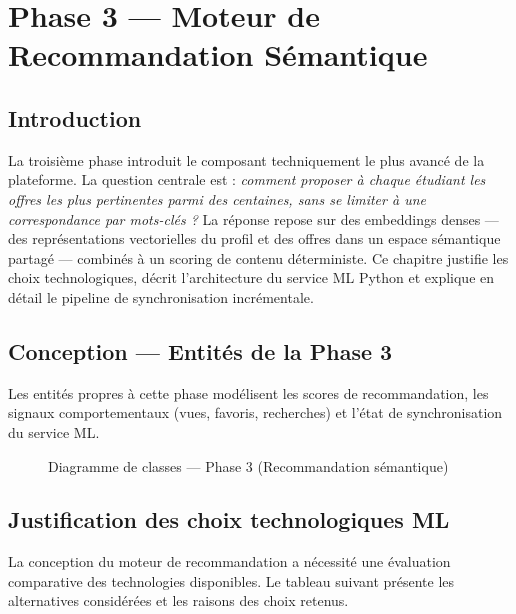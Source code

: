﻿\documentclass[12pt,a4paper]{report}
\begin{document}
\chapter{Phase 3 — Moteur de Recommandation Sémantique}

\section*{Introduction}
La troisième phase introduit le composant techniquement le plus avancé de la plateforme. La question centrale est : \textit{comment proposer à chaque étudiant les offres les plus pertinentes parmi des centaines, sans se limiter à une correspondance par mots-clés ?} La réponse repose sur des embeddings denses — des représentations vectorielles du profil et des offres dans un espace sémantique partagé — combinés à un scoring de contenu déterministe. Ce chapitre justifie les choix technologiques, décrit l'architecture du service ML Python et explique en détail le pipeline de synchronisation incrémentale.

\section{Conception — Entités de la Phase 3}

Les entités propres à cette phase modélisent les scores de recommandation, les signaux comportementaux (vues, favoris, recherches) et l'état de synchronisation du service ML.

\begin{figure}[H]
\centering
\resizebox{0.95\textwidth}{!}{}
\caption{Diagramme de classes — Phase 3 (Recommandation sémantique)}
\label{fig:class_r3}
\end{figure}

\section{Justification des choix technologiques ML}

La conception du moteur de recommandation a nécessité une évaluation comparative des technologies disponibles. Le tableau suivant présente les alternatives considérées et les raisons des choix retenus.
\end{document}
